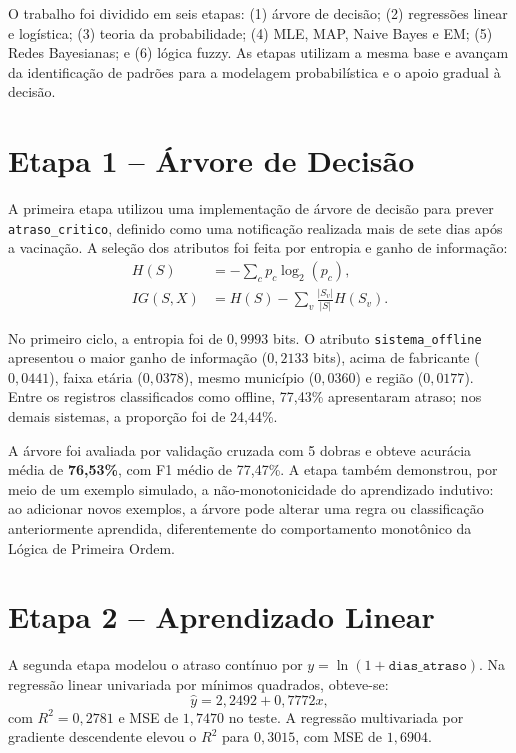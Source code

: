 \documentclass[12pt]{article}
\begin{document}
O trabalho foi dividido em seis etapas: (1) árvore de decisão; (2) regressões linear e logística; (3) teoria da probabilidade; (4) MLE, MAP, Naive Bayes e EM; (5) Redes Bayesianas; e (6) lógica fuzzy. As etapas utilizam a mesma base e avançam da identificação de padrões para a modelagem probabilística e o apoio gradual à decisão.

\section{Etapa 1 -- Árvore de Decisão}

A primeira etapa utilizou uma implementação de árvore de decisão para prever \texttt{atraso\_critico}, definido como uma notificação realizada mais de sete dias após a vacinação. A seleção dos atributos foi feita por entropia e ganho de informação:
\begin{align}
H(S)&=-\sum_c p_c\log_2(p_c),\\
IG(S,X)&=H(S)-\sum_v\frac{|S_v|}{|S|}H(S_v).
\end{align}

No primeiro ciclo, a entropia foi de $0,9993$ bits. O atributo \texttt{sistema\_offline} apresentou o maior ganho de informação ($0,2133$ bits), acima de fabricante ($0,0441$), faixa etária ($0,0378$), mesmo município ($0,0360$) e região ($0,0177$). Entre os registros classificados como offline, 77,43\% apresentaram atraso; nos demais sistemas, a proporção foi de 24,44\%.

A árvore foi avaliada por validação cruzada com 5 dobras e obteve acurácia média de \textbf{76,53\%}, com F1 médio de 77,47\%. A etapa também demonstrou, por meio de um exemplo simulado, a não-monotonicidade do aprendizado indutivo: ao adicionar novos exemplos, a árvore pode alterar uma regra ou classificação anteriormente aprendida, diferentemente do comportamento monotônico da Lógica de Primeira Ordem.

\section{Etapa 2 -- Aprendizado Linear}

A segunda etapa modelou o atraso contínuo por $y=\ln(1+\texttt{dias\_atraso})$. Na regressão linear univariada por mínimos quadrados, obteve-se:
\begin{equation}
\hat y=2,2492+0,7772x,
\end{equation}
com $R^2=0,2781$ e MSE de $1,7470$ no teste. A regressão multivariada por gradiente descendente elevou o $R^2$ para $0,3015$, com MSE de $1,6904$.
\end{document}
